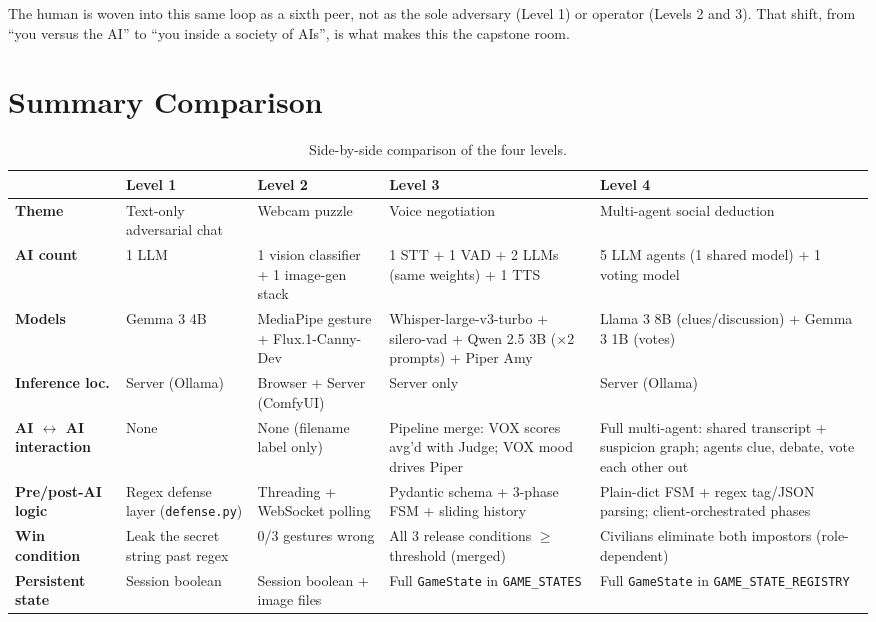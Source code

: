 \documentclass[11pt,a4paper]{article}
\begin{document}
The human is woven into this same loop as a sixth peer, not as the sole adversary
(Level 1) or operator (Levels 2 and 3). That shift, from ``you versus the AI'' to
``you inside a society of AIs'', is what makes this the capstone room.

\section{Summary Comparison}

\begin{table}[H]
\centering
\footnotesize
\renewcommand{\arraystretch}{1.3}
\begin{tabularx}{\linewidth}{>{\bfseries}l X X X X}
\toprule
 & \textbf{Level 1} & \textbf{Level 2} & \textbf{Level 3} & \textbf{Level 4} \\
\midrule
Theme & Text-only adversarial chat & Webcam puzzle & Voice negotiation & Multi-agent social deduction \\
AI count & 1 LLM & 1 vision classifier + 1 image-gen stack & 1 STT + 1 VAD + 2 LLMs (same weights) + 1 TTS & 5 LLM agents (1 shared model) + 1 voting model \\
Models & Gemma 3 4B & MediaPipe gesture + Flux.1-Canny-Dev & Whisper-large-v3-turbo + silero-vad + Qwen 2.5 3B ($\times$2 prompts) + Piper Amy & Llama 3 8B (clues/discussion) + Gemma 3 1B (votes) \\
Inference loc. & Server (Ollama) & Browser + Server (ComfyUI) & Server only & Server (Ollama) \\
AI $\leftrightarrow$ AI interaction & None & None (filename label only) & Pipeline merge: VOX scores avg'd with Judge; VOX mood drives Piper & Full multi-agent: shared transcript + suspicion graph; agents clue, debate, vote each other out \\
Pre/post-AI logic & Regex defense layer (\texttt{defense.py}) & Threading + WebSocket polling & Pydantic schema + 3-phase FSM + sliding history & Plain-dict FSM + regex tag/JSON parsing; client-orchestrated phases \\
Win condition & Leak the secret string past regex & 0/3 gestures wrong & All 3 release conditions $\geq$ threshold (merged) & Civilians eliminate both impostors (role-dependent) \\
Persistent state & Session boolean & Session boolean + image files & Full \texttt{GameState} in \texttt{GAME\_STATES} & Full \texttt{GameState} in \texttt{GAME\_STATE\_REGISTRY} \\
\bottomrule
\end{tabularx}
\caption{Side-by-side comparison of the four levels.}
\end{table}
\end{document}
